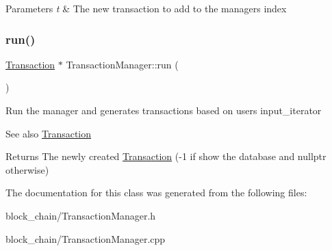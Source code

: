 \begin{DoxyParams}{Parameters}
{\em t} & The new transaction to add to the manager\textquotesingle{}s index \\
\hline
\end{DoxyParams}
\mbox{\label{classTransactionManager_a27147afb36545b306a277697cd9a773d}} 
\subsubsection{\texorpdfstring{run()}{run()}}
{\footnotesize\ttfamily \mbox{\hyperlink{classTransaction}{Transaction}} $\ast$ Transaction\+Manager\+::run (\begin{DoxyParamCaption}{ }\end{DoxyParamCaption})}

Run the manager and generates transactions based on user\textquotesingle{}s input\+\_\+iterator \begin{DoxySeeAlso}{See also}
\mbox{\hyperlink{classTransaction}{Transaction}}
\end{DoxySeeAlso}
\begin{DoxyReturn}{Returns}
The newly created \mbox{\hyperlink{classTransaction}{Transaction}} (-\/1 if show the database and nullptr otherwise) 
\end{DoxyReturn}


The documentation for this class was generated from the following files\+:\begin{DoxyCompactItemize}
\item 
block\+\_\+chain/Transaction\+Manager.\+h\item 
block\+\_\+chain/Transaction\+Manager.\+cpp\end{DoxyCompactItemize}
